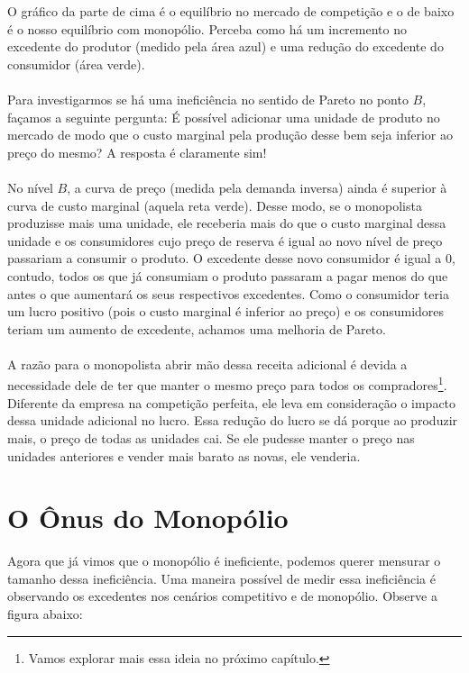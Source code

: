 \documentclass[a4paper,11pt,oneside]{book}
\theoremstyle{definition}
\theoremstyle{break}
\begin{document}
O gráfico da parte de cima é o equilíbrio no mercado de competição e o de baixo é o nosso equilíbrio com monopólio. Perceba como há um incremento no excedente do produtor (medido pela área azul) e uma redução do excedente do consumidor (área verde).
\\
\\
Para investigarmos se há uma ineficiência no sentido de Pareto no ponto $B$, façamos a seguinte pergunta: É possível adicionar uma unidade de produto no mercado de modo que o custo marginal pela produção desse bem seja inferior ao preço do mesmo? A resposta é claramente sim!
\\
\\
No nível $B$, a curva de preço (medida pela demanda inversa) ainda é superior à curva de custo marginal (aquela reta verde). Desse modo, se o monopolista produzisse mais uma unidade, ele receberia mais do que o custo marginal dessa unidade e os consumidores cujo preço de reserva é igual ao novo nível de preço passariam a consumir o produto. O excedente desse novo consumidor é igual a $0$, contudo, todos os que já consumiam o produto passaram a pagar menos do que antes o que aumentará os seus respectivos excedentes. Como o consumidor teria um lucro positivo (pois o custo marginal é inferior ao preço) e os consumidores teriam um aumento de excedente, achamos uma melhoria de Pareto.
\\
\\
A razão para o monopolista abrir mão dessa receita adicional é devida a necessidade dele de ter que manter o mesmo preço para todos os compradores\footnote{Vamos explorar mais essa ideia no próximo capítulo.}. Diferente da empresa na competição perfeita, ele leva em consideração o impacto dessa unidade adicional no lucro. Essa redução do lucro se dá porque ao produzir mais, o preço de todas as unidades cai. Se ele pudesse manter o preço nas unidades anteriores e vender mais barato as novas, ele venderia. 

\section{O Ônus do Monopólio}

Agora que já vimos que o monopólio é ineficiente, podemos querer mensurar o tamanho dessa ineficiência. Uma maneira possível de medir essa ineficiência é observando os excedentes nos cenários competitivo e de monopólio. Observe a figura abaixo:
\end{document}
